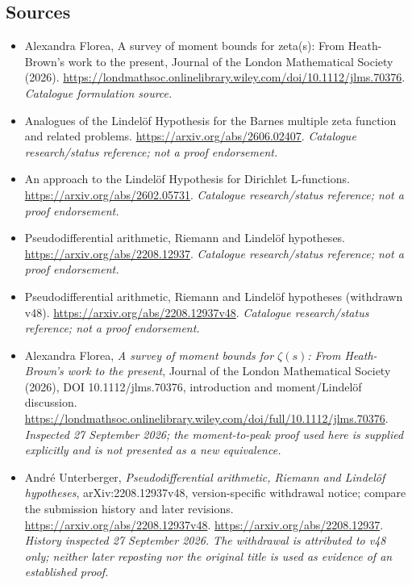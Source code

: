 \documentclass[11pt,a4paper]{article}
\numberwithin{equation}{section}
\begin{document}
\subsection{Sources}
\begin{itemize}\raggedright
\item[\textnormal{[S1]}]\hypertarget{source:1274:1}{} Alexandra Florea, A survey of moment bounds for zeta(s): From Heath-Brown's work to the present, Journal of the London Mathematical Society (2026).
\url{https://londmathsoc.onlinelibrary.wiley.com/doi/10.1112/jlms.70376}.
{\small\textit{Catalogue formulation source.}}
\item[\textnormal{[S2]}]\hypertarget{source:1274:2}{} Analogues of the Lindelöf Hypothesis for the Barnes multiple zeta function and related problems.
\url{https://arxiv.org/abs/2606.02407}.
{\small\textit{Catalogue research/status reference; not a proof endorsement.}}
\item[\textnormal{[S3]}]\hypertarget{source:1274:3}{} An approach to the Lindelöf Hypothesis for Dirichlet L-functions.
\url{https://arxiv.org/abs/2602.05731}.
{\small\textit{Catalogue research/status reference; not a proof endorsement.}}
\item[\textnormal{[S4]}]\hypertarget{source:1274:4}{} Pseudodifferential arithmetic, Riemann and Lindelöf hypotheses.
\url{https://arxiv.org/abs/2208.12937}.
{\small\textit{Catalogue research/status reference; not a proof endorsement.}}
\item[\textnormal{[S5]}]\hypertarget{source:1274:5}{} Pseudodifferential arithmetic, Riemann and Lindelöf hypotheses (withdrawn v48).
\url{https://arxiv.org/abs/2208.12937v48}.
{\small\textit{Catalogue research/status reference; not a proof endorsement.}}
\item[\textnormal{[E1]}]\hypertarget{extra:1274:1}{} Alexandra Florea,
\emph{A survey of moment bounds for $\zeta(s)$: From Heath-Brown's work to
the present}, Journal of the London Mathematical Society (2026),
DOI 10.1112/jlms.70376, introduction and moment/Lindel\"of discussion.
\url{https://londmathsoc.onlinelibrary.wiley.com/doi/full/10.1112/jlms.70376}.
{\small\textit{Inspected 27 September 2026; the moment-to-peak proof used
here is supplied explicitly and is not presented as a new equivalence.}}
\item[\textnormal{[E2]}]\hypertarget{extra:1274:2}{} Andr\'e Unterberger,
\emph{Pseudodifferential arithmetic, Riemann and Lindel\"of hypotheses},
arXiv:2208.12937v48, version-specific withdrawal notice; compare the
submission history and later revisions.
\url{https://arxiv.org/abs/2208.12937v48}.
\url{https://arxiv.org/abs/2208.12937}.
{\small\textit{History inspected 27 September 2026. The withdrawal is
attributed to v48 only; neither later reposting nor the original title is
used as evidence of an established proof.}}
\end{itemize}
\end{document}
